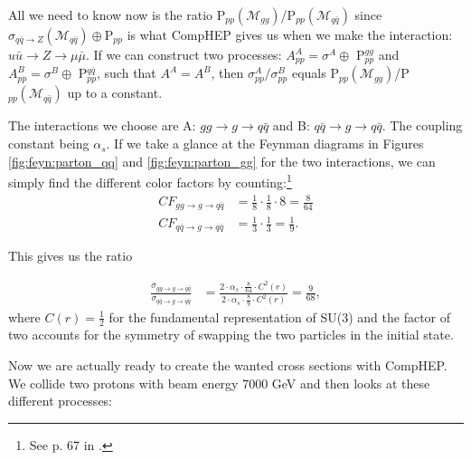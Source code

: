 All we need to know now is the ratio P$_{pp}(\mathcal{M}_{gg})$/P$_{pp}(\mathcal{M}_{q \bar q})$ since $ \sigma_{q \bar q\rightarrow Z}(\mathcal{M}_{q \bar q}) \oplus \textrm{P}_{pp}$ is what CompHEP gives us when we make the interaction: $u \bar u \rightarrow Z \rightarrow \mu \bar \mu $. If we can construct two processes: $A_{pp}^{A}=\sigma^{A} \oplus$ P$_{pp}^{gg}$ and $A_{pp}^{B}=\sigma^{B} \oplus$ P$_{pp}^{q \bar q}$, such that $A^{A}=A^{B}$, then $\sigma_{pp}^{A}/\sigma_{pp}^{B}$ equals  P$_{pp}(\mathcal{M}_{gg})$/P$_{pp}(\mathcal{M}_{q \bar q})$ up to a constant.

The interactions we choose are A: $gg \rightarrow g \rightarrow q \bar q$ and B: $q \bar q \rightarrow g \rightarrow q \bar q$. The coupling constant being $\alpha_{s}$. If we take a glance at the Feynman diagrams in Figures \ref{fig:feyn:parton_qq} and \ref{fig:feyn:parton_gg} for the two interactions, we can simply find the different color factors by counting:\footnote{See p. 67 in  \cite{peskin1993iqf}.}
\begin{align}
	CF_{gg \rightarrow g \rightarrow q \bar q}&=\frac{1}{8} \cdot \frac{1}{8} \cdot 8=\frac{8}{64}\\
	CF_{q \bar q \rightarrow g \rightarrow q \bar q}&=\frac{1}{3} \cdot \frac{1}{3}=\frac{1}{9}.
\end{align}

This gives us the ratio

\begin{align}
	\frac{\sigma_{gg \rightarrow g \rightarrow q \bar q}}{\sigma_{q \bar q \rightarrow g \rightarrow q \bar q}} &=\frac{2 \cdot \alpha_{s} \cdot \frac{8}{64} \cdot C^{2}(r)}{2 \cdot \alpha_{s} \cdot \frac{8}{9} \cdot C^{2}(r)}=\frac{9}{68},
\end{align}
where $C(r) = \frac{1}{2}$ for the fundamental representation of SU(3) and the factor of two accounts for the symmetry of swapping the two particles in the initial state.

Now we are actually ready to create the wanted cross sections with CompHEP. We collide two protons with beam energy 7000 GeV and then looks at these different processes:

